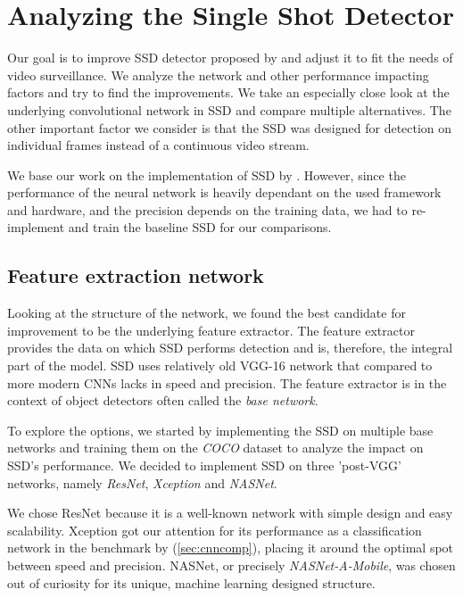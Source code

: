 \chapter{Analyzing the Single Shot Detector}

Our goal is to improve SSD detector proposed by \citeauthor{bib:ssd} and adjust it to fit the needs of video surveillance.  We analyze the network and other performance impacting factors and try to find the improvements. We take an especially close look at the underlying convolutional network in SSD and compare multiple alternatives. The other important factor we consider is that the SSD was designed for detection on individual frames instead of a continuous video stream.

We base our work on the implementation of SSD by \citeauthor{bib:ssd}. However, since the performance of the neural network is heavily dependant on the used framework and hardware, and the precision depends on the training data, we had to re-implement and train the baseline SSD for our comparisons.

\section{Feature extraction network}
\label{sec:base}
Looking at the structure of the network, we found the best candidate for improvement to be the underlying feature extractor. The feature extractor provides the data on which SSD performs detection and is, therefore, the integral part of the model. SSD uses relatively old VGG-16 network that compared to more modern CNNs lacks in speed and precision.  The feature extractor is in the context of object detectors often called the \textit{base network}.

To explore the options, we started by implementing the SSD on multiple base networks and training them on the \textit{COCO} dataset to analyze the impact on SSD's performance. We decided to implement SSD on three 'post-VGG' networks, namely \textit{ResNet}, \textit{Xception} and \textit{NASNet}. 

We chose ResNet because it is a well-known network with simple design and easy scalability. Xception got our attention for its performance as a classification network in the benchmark by \citeauthor{bib:cnnbenchmark} (\cref{sec:cnncomp}), placing it around the optimal spot between speed and precision. NASNet, or precisely \textit{NASNet-A-Mobile}, was chosen out of curiosity for its unique, machine learning designed structure.

